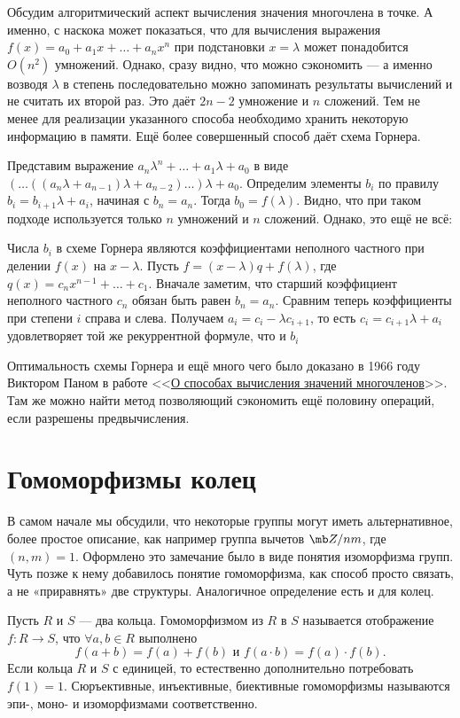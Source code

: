  

Обсудим алгоритмический аспект вычисления значения многочлена в точке. А именно, с наскока может показаться, что для вычисления выражения $f(x)=a_0+a_1x+\dots+a_nx^n$ при подстановки $x=\lambda$ может понадобится $O(n^2)$ умножений. Однако, сразу видно, что можно сэкономить --- а именно возводя $\lambda$ в степень последовательно можно запоминать результаты вычислений и не считать их второй раз. Это даёт $2n-2$ умножение и $n$ сложений. Тем не менее для реализации указанного способа необходимо хранить некоторую информацию в памяти. Ещё более совершенный способ даёт схема Горнера. 

Представим выражение $a_n\lambda^n+\dots+a_1\lambda+a_0$ в виде $(\dots((a_n\lambda+a_{n-1})\lambda+a_{n-2})\dots)\lambda+a_0$. Определим элементы $b_i$ по правилу $b_i=b_{i+1}\lambda+a_i$, начиная с $b_n=a_n$. Тогда $b_0=f(\lambda)$. Видно, что при таком подходе используется только $n$ умножений и $n$ сложений. Однако, это ещё не всё:

\lm Числа $b_i$ в схеме Горнера являются коэффициентами неполного частного при делении $f(x)$ на $x-\lambda$. 
\elm
\proof
Пусть $f=(x-\lambda)q+f(\lambda)$, где $q(x)=c_nx^{n-1} +\dots +c_1$. Вначале заметим, что старший коэффициент неполного частного $c_n$ обязан быть равен $b_n=a_n$. Сравним теперь коэффициенты при степени $i$ справа и слева. Получаем $a_{i}=c_{i}-\lambda c_{i+1}$, то есть $c_i=c_{i+1}\lambda +a_{i}$ удовлетворяет той же рекуррентной формуле, что и $b_i$
\endproof

Оптимальность схемы Горнера и ещё много чего было доказано в 1966 году Виктором Паном в работе <<\href{http://www.mathnet.ru/php/archive.phtml?wshow=paper&jrnid=rm&paperid=5823&option_lang=rus}{О способах вычисления значений многочленов}>>. Там же можно найти метод позволяющий сэкономить ещё половину операций, если разрешены предвычисления.


\section{Гомоморфизмы колец}

В самом начале мы обсудили, что некоторые группы могут иметь альтернативное, более простое описание, как например группа вычетов $\mb Z/nm$, где $(n,m)=1$. Оформлено это замечание было в виде понятия изоморфизма групп. Чуть позже к нему добавилось понятие гомоморфизма, как способ просто связать, а не «приравнять» две структуры. Аналогичное определение есть и для колец.

 Пусть $R$ и $S$ --- два кольца. Гомоморфизмом из $R$ в $S$ называется отображение $f\colon R \to S$, что
$\forall a,b \in R$ выполнено 
$$f(a+b)=f(a)+f(b)\text{  и  }f(a\cdot b)=f(a) \cdot f(b).$$
Если кольца $R$ и $S$ с единицей, то естественно дополнительно потребовать $f(1) = 1$. Сюръективные, инъективные, биективные гомоморфизмы называются эпи-, моно- и изоморфизмами соответственно.
\edfn

